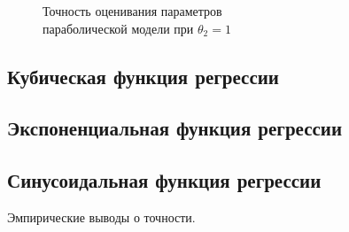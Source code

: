 \begin{figure}[p]
  \vspace{\baselineskip}
  \caption{
    Точность оценивания параметров \\
    параболической модели при \( \theta_2 = 1 \)
  }\label{fig:comparison_nonlinear_quadratic_beta-1}
\end{figure}




\subsection{Кубическая функция регрессии}

\subsection{Экспоненциальная функция регрессии}

\subsection{Синусоидальная функция регрессии}

Эмпирические выводы о точности.